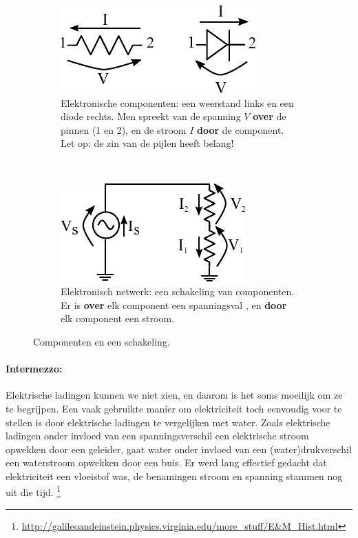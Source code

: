 \documentclass{article}
\begin{document}
		\begin{figure}[hbtp]
			\centering
			\begin{subfigure}[b]{0.5\linewidth}
				\centering
				\includegraphics{componenten}
				\caption{Elektronische componenten: een weerstand links en een diode rechts. Men spreekt van de spanning $V$ \textbf{over} de pinnen (1 en 2), en de stroom $I$ \textbf{door} de component. Let op: de zin van de pijlen heeft belang!}
				\label{subfig:componenten}
			\end{subfigure}
			~
			\begin{subfigure}[b]{0.5\linewidth}
				\centering
				\includegraphics{weerstandsdeler}
				\caption{Elektronisch netwerk: een schakeling van componenten. Er is \textbf{over} elk component een spanningsval , en \textbf{door} elk component een stroom.}
				\label{subfig:netwerk}
			\end{subfigure}
			\caption{Componenten en een schakeling. }
			\label{fig:component_en_schakeling}
		\end{figure}

		\paragraph*{Intermezzo:} Elektrische ladingen kunnen we niet zien, en daarom is het soms moeilijk om ze te begrijpen. Een vaak gebruikte manier om elektriciteit toch eenvoudig voor te stellen is door elektrische ladingen te vergelijken met water. Zoals elektrische ladingen onder invloed van een spanningsverschil een elektrische stroom opwekken door een geleider, gaat water onder invloed van een (water)drukverschil een waterstroom opwekken door een buis. Er werd lang effectief gedacht dat elektriciteit een vloeistof was, de benamingen stroom en spanning stammen nog uit die tijd. \footnote{\url{http://galileoandeinstein.physics.virginia.edu/more_stuff/E&M_Hist.html}}
\end{document}

